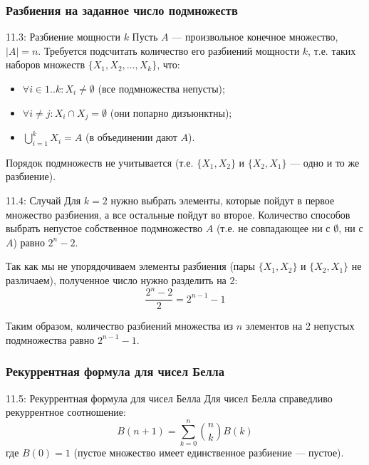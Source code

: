 \documentclass[a4paper,12pt]{article}
\begin{document}
	\subsubsection{Разбиения на заданное число подмножеств}
	
	\begin{definitionbox}{11.3: Разбиение мощности \(k\)}
		Пусть \(A\) — произвольное конечное множество, \(|A| = n\). Требуется подсчитать количество его разбиений мощности \(k\), т.е. таких наборов множеств \(\{X_1, X_2, \dots, X_k\}\), что:
		\begin{itemize}
			\item \(\forall i \in 1..k : X_i \neq \emptyset\) (все подмножества непусты);
			\item \(\forall i \neq j : X_i \cap X_j = \emptyset\) (они попарно дизъюнктны);
			\item \(\bigcup_{i=1}^k X_i = A\) (в объединении дают \(A\)).
		\end{itemize}
		Порядок подмножеств не учитывается (т.е. \(\{X_1, X_2\}\) и \(\{X_2, X_1\}\) — одно и то же разбиение).
	\end{definitionbox}
	
	\begin{examplebox}{11.4: Случай}
		Для \(k = 2\) нужно выбрать элементы, которые пойдут в первое множество разбиения, а все остальные пойдут во второе. Количество способов выбрать непустое собственное подмножество \(A\) (т.е. не совпадающее ни с \(\emptyset\), ни с \(A\)) равно \(2^n - 2\). 
		
		Так как мы не упорядочиваем элементы разбиения (пары \(\{X_1, X_2\}\) и \(\{X_2, X_1\}\) не различаем), полученное число нужно разделить на \(2\):
		\[ \frac{2^n - 2}{2} = 2^{n-1} - 1 \]
		
		Таким образом, количество разбиений множества из \(n\) элементов на 2 непустых подмножества равно \(2^{n-1} - 1\).
	\end{examplebox}
	
	\subsubsection{Рекуррентная формула для чисел Белла}
	
	\begin{theorembox}{11.5: Рекуррентная формула для чисел Белла}
		Для чисел Белла справедливо рекуррентное соотношение:
		\[ B(n+1) = \sum_{k=0}^{n} \binom{n}{k} B(k) \]
		где \(B(0) = 1\) (пустое множество имеет единственное разбиение — пустое).
	\end{theorembox}
	
\end{document}
